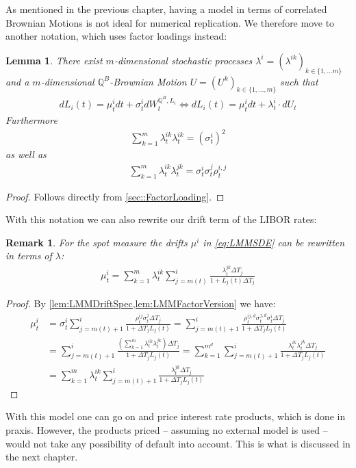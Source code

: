 \documentclass[12pt]{article}
\newtheorem{lemma}[theorem]{Lemma}
\newtheorem{remark}[theorem]{Remark}
\begin{document}
	As mentioned in the previous chapter, having a model in terms of correlated Brownian Motions is not ideal for numerical replication. We therefore move to another notation, which uses factor loadings instead:
	\begin{lemma}\label{lem:LMMFactorVersion}
		There exist $m$-dimensional stochastic processes $\lambda^{i} = (\lambda^{i k})_{k \in \{1, ... m\}}$ and a $m$-dimensional $\mathbb{Q}^B$-Brownian Motion $U=(U^k)_{k \in \{1,...,m\}}$ such that
		\begin{align*}
			dL_i(t) = \mu^{i}_t dt + \sigma^{i}_t dW^{\mathbb{Q}^B, L_i}_t \iff 
			dL_i(t) = \mu^{i}_t dt + \lambda^{i}_t\cdot dU_t
		\end{align*}
		Furthermore
		\begin{align*}
			\sum_{k=1}^{m}\lambda^{i k}_t \lambda^{i k}_t = (\sigma^i_t)^2
		\end{align*}
		as well as
		\begin{align*}
			\sum_{k=1}^{m}\lambda^{i k}_t \lambda^{j k}_t = \sigma^i_t \sigma^j_t \rho^{i,j}_t
		\end{align*}
	\end{lemma}
	\begin{proof}
		Follows directly from \cref{sec::FactorLoading}.
	\end{proof}
	With this notation we can also rewrite our drift term of the LIBOR rates:
	\begin{remark}\label{rem:LMMDriftFactorLoadings}
		For the spot measure the drifts $\mu^{i}$ in \cref{eq:LMMSDE} can be rewritten in terms of $\lambda$:
		\begin{align*}
			\mu^{i}_t = \sum_{k=1}^{m}\lambda^{i k}_t \sum_{j=m(t)}^{i}\frac{\lambda^{j k}_t\Delta T_j}{1 + L_j(t)\Delta T_j}
		\end{align*}
	\end{remark}
	\begin{proof}
		By \cref{lem:LMMDriftSpec,lem:LMMFactorVersion} we have:
		\begin{align*}
			\mu^{i}_t &= \sigma^{i}_t\sum_{j=m(t)+1}^{i}\frac{\rho^{i j}_t \sigma^{j}_t\Delta T_j}{1 + \Delta T_j L_j(t)} = \sum_{j=m(t)+1}^{i}\frac{\rho^{i j, d}_t \sigma^{j, d}_t \sigma^{i}_t\Delta T_j}{1 + \Delta T_j L_j(t)}\\
			&= \sum_{j=m(t)+1}^{i}\frac{\left(\sum_{k=1}^{m}\lambda^{i k}_t\lambda^{j k}_t\right)\Delta T_j}{1 + \Delta T_j L_j(t)}
			=\sum_{k=1}^{m^d}\sum_{j=m(t)+1}^{i}\frac{\lambda^{i k}_t\lambda^{j k}_t\Delta T_j}{1 + \Delta T_j L_j(t)}\\
			&= \sum_{k=1}^{m}\lambda^{i k}_t\sum_{j=m(t)+1}^{i}\frac{\lambda^{j k}_t\Delta T_j}{1 + \Delta T_j L_j(t)}
		\end{align*}
	\end{proof}
	With this model one can go on and price interest rate products, which is done in praxis. However, the products priced -- assuming no external model is used -- would not take any possibility of default into account. This is what is discussed in the next chapter.
	
\end{document}
